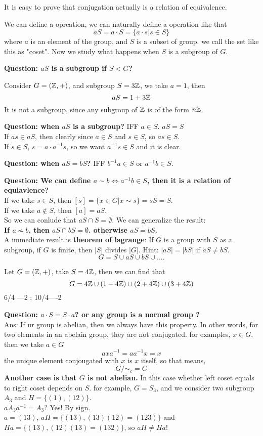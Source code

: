 \documentclass[en,geye,blue,normal,12pt]{elegantnote}
\begin{document}
It is easy to prove that conjugation actually is a relation of equivalence.

We can define a opreation, we can naturally define a operation like that
\[aS = a\cdot S = \{a\cdot s | s \in S\}\]
where \(a \) is an element of the group, and \(S\) is a subset of group. we call the set like this as "coset". Now we study what happens when \(S\) is a subgroup of \(G\).

\textbf{Question: \(aS\) is a subgroup if \(S < G\)?}

Consider \(G=(\mathbb{Z},+)\), and subgroup \(S = 3\mathbb{Z}\), we take \(a = 1\), then
\[aS = 1+3\mathbb{Z}\]
It is not a subgroup, since any subgroup of \(\mathbb{Z}\) is of the form \(n\mathbb{Z}\).

\textbf{Question:  when \(aS\) is a subgroup?}
IFF \(a \in  S\). \(aS=S\)\\
If \(as \in aS\), then clearly since \(a \in S\) and \(s \in S\), so \(as \in S\).\\
If \(s \in S\), \(s = a \cdot a^{-1}s\), so we want \(a^{-1}s \in S\) and it is clear.

\textbf{Question: when \(aS = bS\)?} IFF \(b^{-1}a \in S\) or \(a^{-1}b \in S\).

\textbf{Question: We can define \(a \sim b \iff a^{-1}b \in  S\), then it is a relation of equiavlence?}\\
If we take \(s \in S\), then \([s] = \{x \in G| x \sim s\} = sS = S\).\\
If we take \(a \notin S\), then \([a] = aS\).\\
So we can conlude that \(aS \cap S = \emptyset \). We can generalize the result:\\
\textbf{If \(a \nsim b\), then \( aS \cap bS = \emptyset\). otherwise \(aS = bS\).}\\
A immediate result is  \textbf{theorem of lagrange}: If \(G\) is a group with \(S\) as a subgroup, if \(G\) is finite, then \(|S|\) divides \(|G|\).
Hint: \(|aS| = |bS|\) if \(aS \neq bS\).
\[G = S \cup aS \cup bS \cup ....\]

\begin{example}
  Let \(G = (\mathbb{Z},+)\), take \(S  = 4\mathbb{Z}\), then we can find that
  \[G = 4\mathbb{Z} \cup (1+4\mathbb{Z}) \cup (2+4\mathbb{Z})\cup (3+4\mathbb{Z})\]
  6/4 ---2 ;  10/4----2
\end{example}

\textbf{Question: \(a\cdot S = S\cdot a\)?
 or any group is a normal group ?}\\
Ans: If ur group is abelian, then we always have this property. In other words, for two elements in an abelain group, they are not conjugated. for examples, \(x\in G\), then we take \(a \in G\)
\[axa^{-1} = aa^{-1}x = x\]
the unique element conjougated with \(x\) is \(x \) itself, so that means,
\[G/\sim_c  = G\]
\textbf{Another case is that \(G\) is not abelian.} In this case whether left coset equals to right coset depends on \(S\). for example, \(G = S_3\), and we consider two subgroup \(A_3\) and \(H = \{(1),(12)\}\).\\
\(aA_3a^{-1} = A_3\)?  Yes! By sign.\\
\(a = (13)\), \(aH = \{(13),(13)(12) = (123)\}\) and \(Ha = \{(13), (12)(13)=(132)\}\), so \(aH \neq Ha!\)
\end{document}

